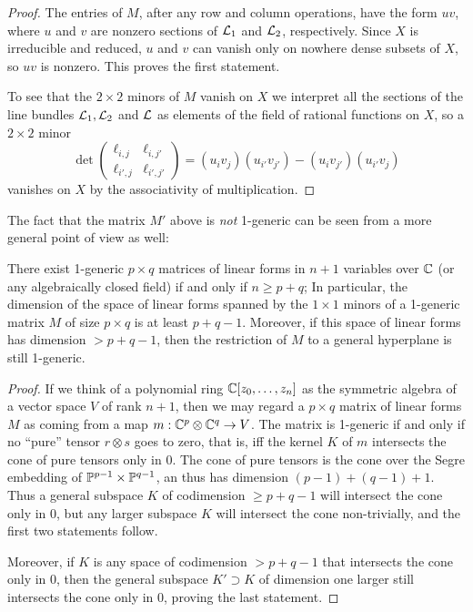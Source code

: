 \begin{proof}
The entries of $M$, after any row and column operations, have the form $uv$, where
$u$ and $v$ are nonzero sections of ${\mathcal L}_1$ and ${\mathcal L}_2$, respectively. Since $X$ is irreducible and reduced, $u$ and $v$ can vanish only on nowhere dense subsets of $X$, so $uv$ is nonzero. This proves the first statement.

To see that the $2\times 2$ minors of $M$ vanish on $X$ we interpret all the sections of the line bundles ${\mathcal L}_{1}, {\mathcal L}_{2}$ and ${\mathcal L}$ as elements of the 
field of rational functions on $X$, so a $2\times 2$ minor 
$$
\det
\begin{pmatrix}
 \ell_{i,j}&\ell_{i,j'} \\
 \ell_{i',j}&\ell_{i',j'}
\end{pmatrix}
= (u_iv_j)(u_{i'}v_{j'}) - (u_{i}v_{j'}) (u_{i'}v_{j})
$$
vanishes on $X$ by the associativity of multiplication.
\end{proof}

The fact that the matrix $M'$ above is \emph{not} 1-generic can be seen from a more general point of view as well:

\begin{lemma} \label{size of 1-generic}
There exist 1-generic $p\times q$ matrices of linear forms in $n+1$ variables over ${\mathbb C}$ (or any algebraically closed field) if and only if $n\geq p+q$;
In particular, the dimension of the space of linear forms spanned by the $1\times 1$ minors of a  1-generic matrix $M$ of size $p\times q$ is at least $p+q-1$. Moreover, if this space of linear forms has dimension $>p+q-1$, then the restriction of $M$ to a general hyperplane is still 1-generic.
\end{lemma}

\begin{proof}
If we think of a polynomial ring ${\mathbb C}[z_0,\dots,z_n]$ as the symmetric algebra
of a vector space $V$ of rank $n+1$, then we may regard a $p\times q$ matrix of
linear forms $M$ as coming from a map $m: {\mathbb C}^{p}\otimes {\mathbb C}^{q}\to V$. The matrix is 1-generic
if and only if no ``pure'' tensor $r\otimes s$ goes to zero, that is, iff the kernel $K$ of $m$ intersects the cone of
pure tensors only in 0. The cone of pure tensors is the cone over the Segre embedding of ${\mathbb P}^{p-1}\times {\mathbb P}^{q-1}$, 
an thus has dimension $(p-1)+(q-1)+1$. Thus a general subspace $K$ of codimension $\geq p+q-1$ will intersect the cone
only in 0, but any larger subspace $K$ will intersect the cone non-trivially,  and the first two statements follow.

Moreover, if $K$ is any space of codimension $>p+q-1$ that intersects the cone only in 0, then the general subspace $K'\supset K$
of dimension one larger still intersects the cone only in 0, proving the last statement.
\end{proof}

